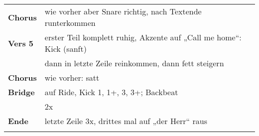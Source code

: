\begin{tabular}{p{1.6cm}l}
	\textbf{Chorus} & wie vorher aber Snare richtig, nach Textende runterkommen            \\
	\textbf{Vers 5} & erster Teil komplett ruhig, Akzente auf „Call me home“: Kick (sanft) \\
	                & dann in letzte Zeile reinkommen, dann fett steigern                  \\
	\textbf{Chorus} & wie vorher: satt                                                     \\
	\textbf{Bridge} & auf Ride, Kick 1, 1+, 3, 3+; Backbeat                                \\
	                & 2x                                                                   \\
	\textbf{Ende}   & letzte Zeile 3x, drittes mal auf „der Herr“ raus                     \\
	                &                                                                      \\
\end{tabular}

